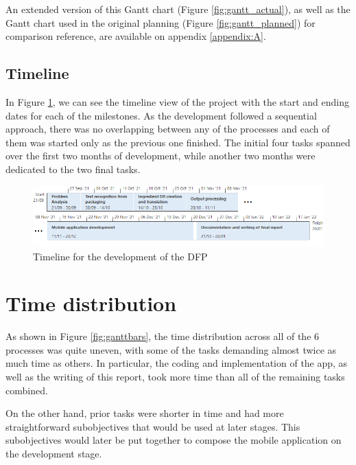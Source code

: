 An extended version of this Gantt chart (Figure \ref{fig:gantt_actual}), as well as the Gantt chart used in the original planning (Figure \ref{fig:gantt_planned}) for comparison reference, are available on appendix \ref{appendix:A}.

\subsection{Timeline}

In Figure \ref{fig:timeline}, we can see the timeline view of the project with the start and ending dates for each of the milestones. As the development followed a sequential approach, there was no overlapping between any of the processes and each of them was started only as the previous one finished. The initial four tasks spanned over the first two months of development, while another two months were dedicated to the two final tasks.

\begin{figure}[h]
  \centering
  \includegraphics[width=\textwidth]{Figures/timeline.png}
  \caption{%
    Timeline for the development of the DFP
  }
  \label{fig:timeline}
\end{figure}

\section{Time distribution}

As shown in Figure \ref{fig:ganttbars}, the time distribution across all of the 6 processes was quite uneven, with some of the tasks demanding almost twice as much time as others. In particular, the coding and implementation of the app, as well as the writing of this report, took more time than all of the remaining tasks combined.

On the other hand, prior tasks were shorter in time and had more straightforward subobjectives that would be used at later stages. This subobjectives would later be put together to compose the mobile application on the development stage.

